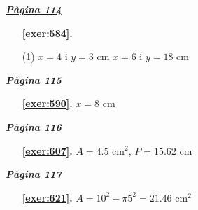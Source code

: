  \vspace{1cm} 
 

\vspace{0.3cm}


\hyperlink{page.114}{\textbf{\em Pàgina 114}}
\begin{enumerate}



 \item[\fontfamily{phv}\selectfont\color{blue}\textbf{\ref{exer:584}. }] \label{ans:584}
 \begin{tasks}[column-sep=1em, item-indent=1.3333em](1)
	 \task $x=4$ i $y=3$ cm
	 \task $x=6$ i $y=18$ cm
\end{tasks}
 \end{enumerate}
\vspace{0.3cm}


\hyperlink{page.115}{\textbf{\em Pàgina 115}}
\begin{enumerate}
\item[\fontfamily{phv}\selectfont\color{blue}\textbf{\ref{exer:590}. }] \label{ans:590} 
$x=8$ cm
 \end{enumerate}
\vspace{0.3cm}


\hyperlink{page.116}{\textbf{\em Pàgina 116}}
\begin{enumerate}
\item[\fontfamily{phv}\selectfont\color{blue}\textbf{\ref{exer:607}. }] \label{ans:607} 
$A=4.5$ cm$^2$, $P=15.62$ cm
 \end{enumerate}
\vspace{0.3cm}


\hyperlink{page.117}{\textbf{\em Pàgina 117}}
\begin{enumerate}
\item[\fontfamily{phv}\selectfont\color{blue}\textbf{\ref{exer:621}. }] \label{ans:621} 
$A=10^2-\pi 5^2=21.46$ cm$^2$
 \end{enumerate}
\vspace{0.3cm}


